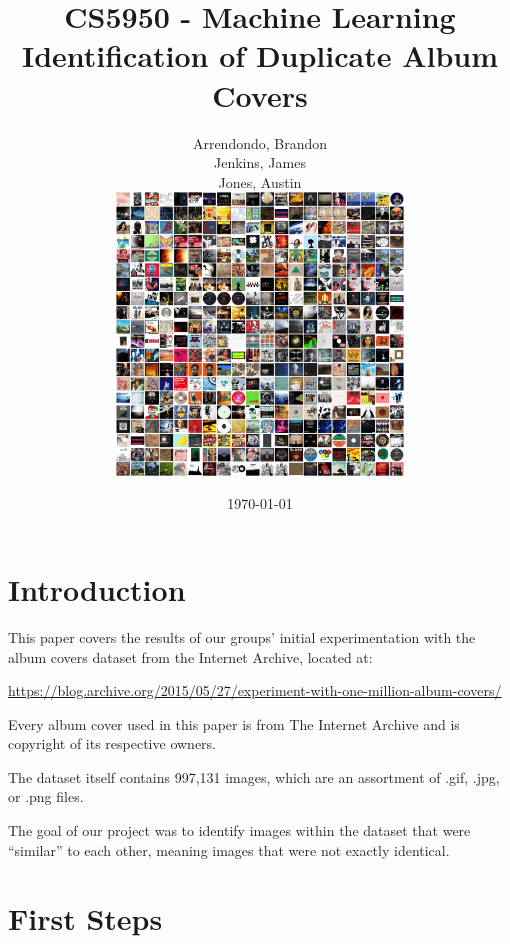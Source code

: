 \documentclass[11pt,a4paper,titlepage]{article}
\begin{document}
\title{CS5950 - Machine Learning \\
       Identification of Duplicate Album Covers}

\author{Arrendondo, Brandon\\
        Jenkins, James\\
        Jones, Austin\\
        \includegraphics[width=3in]{covers.png}\\[1ex]
    }
\date{\today}

\maketitle

\newpage

\section{Introduction}

This paper covers the results of our groups' initial experimentation with the
album covers dataset from the Internet Archive, located at:

\url{https://blog.archive.org/2015/05/27/experiment-with-one-million-album-covers/}

Every album cover used in this paper is from The Internet Archive and is 
copyright of its respective owners.

The dataset itself contains 997,131 images, which are an assortment of .gif,
.jpg, or .png files.

The goal of our project was to identify images within the dataset that were 
``similar'' to each other, meaning images that were not exactly identical.

\section{First Steps}
\end{document}
